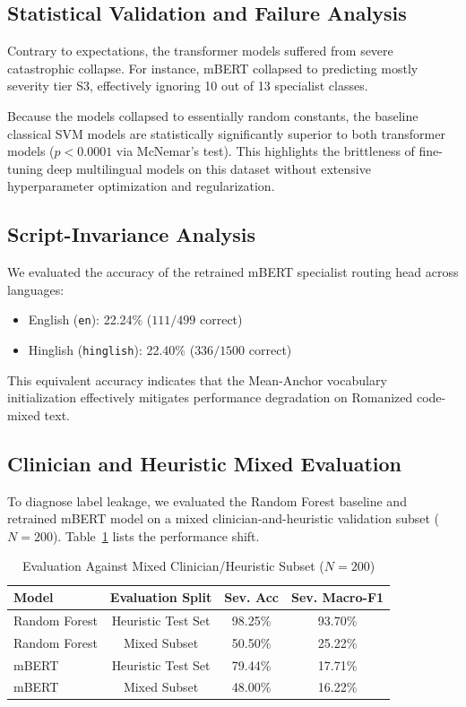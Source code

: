 \documentclass[10pt,conference]{IEEEtran}
\begin{document}
\subsection{Statistical Validation and Failure Analysis}
Contrary to expectations, the transformer models suffered from severe catastrophic collapse. For instance, mBERT collapsed to predicting mostly severity tier S3, effectively ignoring 10 out of 13 specialist classes. 

Because the models collapsed to essentially random constants, the baseline classical SVM models are statistically significantly superior to both transformer models ($p < 0.0001$ via McNemar's test). This highlights the brittleness of fine-tuning deep multilingual models on this dataset without extensive hyperparameter optimization and regularization.

\subsection{Script-Invariance Analysis}
We evaluated the accuracy of the retrained mBERT specialist routing head across languages:
\begin{itemize}
    \item English (\texttt{en}): 22.24\% ($111 / 499$ correct)
    \item Hinglish (\texttt{hinglish}): 22.40\% ($336 / 1500$ correct)
\end{itemize}
This equivalent accuracy indicates that the Mean-Anchor vocabulary initialization effectively mitigates performance degradation on Romanized code-mixed text.

\subsection{Clinician and Heuristic Mixed Evaluation}
To diagnose label leakage, we evaluated the Random Forest baseline and retrained mBERT model on a mixed clinician-and-heuristic validation subset ($N=200$). Table~\ref{tab:clinician_results} lists the performance shift.

\begin{table}[h]
\centering
\caption{Evaluation Against Mixed Clinician/Heuristic Subset ($N=200$)}
\label{tab:clinician_results}
\begin{tabular}{l c c c}
\toprule
\textbf{Model} & \textbf{Evaluation Split} & \textbf{Sev. Acc} & \textbf{Sev. Macro-F1} \\
\midrule
Random Forest & Heuristic Test Set & 98.25\% & 93.70\% \\
Random Forest & Mixed Subset & 50.50\% & 25.22\% \\
\midrule
mBERT & Heuristic Test Set & 79.44\% & 17.71\% \\
mBERT & Mixed Subset & 48.00\% & 16.22\% \\
\bottomrule
\end{tabular}
\end{table}
\end{document}
